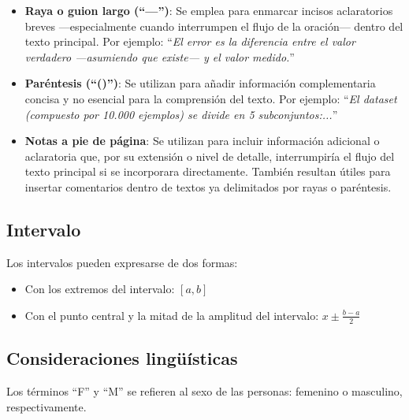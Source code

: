 \begin{itemize}
    \item \textbf{Raya o guion largo (``---'')}: Se emplea para enmarcar incisos aclaratorios breves
    ---especialmente cuando interrumpen el flujo de la oración--- dentro del texto principal.
    Por ejemplo: ``\textit{El error es la diferencia entre el valor verdadero ---asumiendo que existe--- y el 
    valor medido.}''

    \item \textbf{Paréntesis (``()'')}: Se utilizan para añadir información complementaria concisa y no 
    esencial para la comprensión del texto.
    Por ejemplo: ``\textit{El dataset (compuesto por 10.000 ejemplos) se divide en 5 subconjuntos:...}''

    \item \textbf{Notas a pie de página}: Se utilizan para incluir información adicional o aclaratoria que, 
    por su extensión o nivel de detalle, interrumpiría el flujo del texto principal si se incorporara 
    directamente. También resultan útiles para insertar comentarios dentro de textos ya delimitados por 
    rayas o paréntesis.
    
\end{itemize}


\subsection*{Intervalo}

Los intervalos pueden expresarse de dos formas:

\begin{itemize}
    \item Con los extremos del intervalo: $[a,b]$
    \item Con el punto central y la mitad de la amplitud del intervalo: $x \pm \frac{b-a}{2}$
\end{itemize}


\subsection*{Consideraciones lingüísticas}

Los términos ``F'' y ``M'' se refieren al sexo de las personas: femenino o masculino, respectivamente. 
